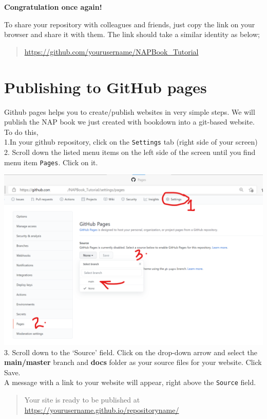 \documentclass[
]{book}
\begin{document}
\textbf{Congratulation once again!}

To share your repository with colleagues and friends, just copy the link on your browser and share it with them. The link should take a similar identity as below;

\begin{quote}
\url{https://github.com/yourusername/NAPBook_Tutorial}
\end{quote}

\hypertarget{publishing-to-github-pages}{%
\section{Publishing to GitHub pages}\label{publishing-to-github-pages}}

Github pages helps you to create/publish websites in very simple steps.
We will publish the NAP book we just created with bookdown into a git-based website.
To do this,\\
1.In your github repository, click on the \texttt{Settings} tab (right side of your screen)\\
2. Scroll down the listed menu items on the left side of the screen until you find menu item \texttt{Pages}. Click on it.

\includegraphics{tutorial_screenshots/gh_pages_setup.png}\\
3. Scroll down to the `Source' field. Click on the drop-down arrow and select the \textbf{main/master} branch and \textbf{docs} folder as your source files for your website. Click Save.\\
A message with a link to your website will appear, right above the \texttt{Source} field.

\begin{quote}
Your site is ready to be published at \url{https://yourusername.github.io/repositoryname/}
\end{quote}
\end{document}
